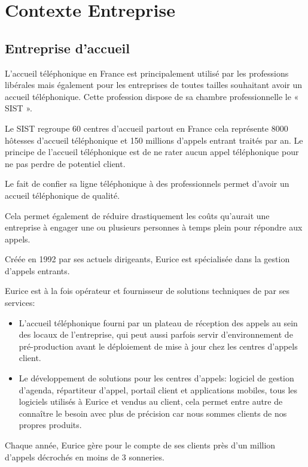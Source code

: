 \chapter{Contexte Entreprise}
\section{Entreprise d'accueil}
L’accueil téléphonique en France est principalement utilisé par les professions libérales 
mais également pour les entreprises de toutes tailles souhaitant avoir un accueil téléphonique.
Cette profession dispose de sa chambre professionnelle  le « SIST ». \newline

Le SIST regroupe 60 centres d’accueil partout en France cela représente 
8000 hôtesses d'accueil téléphonique et 150 millions d'appels entrant traités par an. 
Le principe de l’accueil téléphonique est de ne rater aucun appel téléphonique 
pour ne pas perdre de potentiel client. \newline

Le fait de confier sa ligne téléphonique à des professionnels 
permet d’avoir un accueil téléphonique de qualité.

Cela permet également de réduire drastiquement les coûts qu’aurait une entreprise à engager 
une ou plusieurs personnes à temps plein pour répondre aux appels.\newline

Créée en 1992 par ses actuels dirigeants, Eurice est spécialisée dans la gestion d'appels entrants.

Eurice est à la fois opérateur et fournisseur de solutions techniques de par ses services:\newline
\begin{itemize}
	\item L'accueil téléphonique fourni par un plateau de réception des appels 
	au sein des locaux de l'entreprise, qui peut aussi parfois servir d’environnement de pré-production 
	avant le déploiement de mise à jour chez les centres d'appels client.

	\item Le développement de solutions pour les centres d'appels: logiciel de gestion d'agenda, 
	répartiteur d'appel, portail client et applications mobiles, tous les logiciels utilisés à Eurice 
	et vendus au client, cela permet entre autre de connaître le besoin avec plus de précision 
	car nous sommes clients de nos propres produits. \newline
\end{itemize}
Chaque année, Eurice gère pour le compte de ses clients près 
d'un million d'appels décrochés en moins de 3 sonneries.
\newpage

